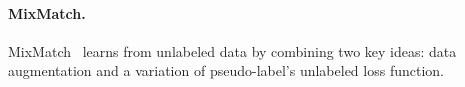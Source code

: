 


\paragraph{MixMatch.} MixMatch~\citep{berthelotMixmatchHolisticApproach2019} learns from unlabeled data by combining two key ideas: data augmentation and a variation of pseudo-label's unlabeled loss function.

